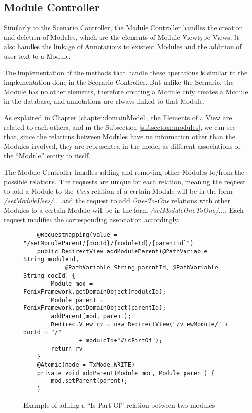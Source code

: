 \subsection{Module Controller}

Similarly to the Scenario Controller, the Module Controller handles the creation and deletion of Modules, which are the elements of Module Viewtype Views. It also handles the linkage of Annotations to existent Modules and the addition of user text to a Module. 

The implementation of the methods that handle these operations is similar to the implementation done in the Scenario Controller. But unlike the Scenario, the Module has no other elements, therefore creating a Module only creates a Module in the database, and annotations are always linked to that Module.

As explained in Chapter \ref{chapter:domainModel}, the Elements of a View are related to each others, and in the Subsection \ref{subsection:modules}, we can see that, since the relations between Modules have no information other than the Modules involved, they are represented in the model as different associations of the ``Module'' entity to itself. 

The Module Controller handles adding and removing other Modules to/from the possible relations. The requests are unique for each relation, meaning the request to add a Module to the \textit{Uses} relation of a certain Module will be in the form \textit{/setModuleUses/...} and the request to add \textit{One-To-One} relations with other Modules to a certain Module will be in the form \textit{/setModuleOneToOne/...}. Each request modifies the corresponding association accordingly.
\begin{figure}[h]
\lstset{style=customjava}
\begin{lstlisting}
	@RequestMapping(value = "/setModuleParent/{docId}/{moduleId}/{parentId}")
	public RedirectView addModuleParent(@PathVariable String moduleId,
			@PathVariable String parentId, @PathVariable String docId) {
		Module mod = FenixFramework.getDomainObject(moduleId);
		Module parent = FenixFramework.getDomainObject(parentId);
		addParent(mod, parent);
		RedirectView rv = new RedirectView("/viewModule/" + docId + "/"
				+ moduleId+"#isPartOf");
		return rv;
	}
	@Atomic(mode = TxMode.WRITE)
	private void addParent(Module mod, Module parent) {
		mod.setParent(parent);
	}	
\end{lstlisting}
\caption{Example of adding a ``Is-Part-Of'' relation between two modules}
\label{figure:ModuleControllerIsPartOf}
\end{figure} 

